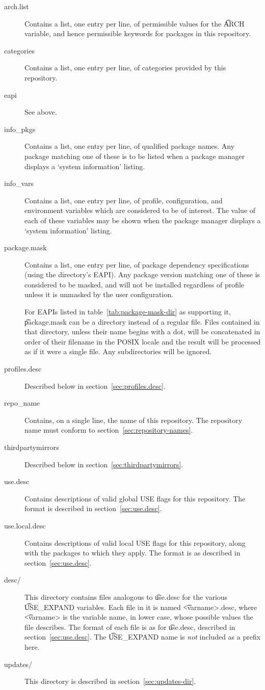 \begin{description}
\item[arch.list] Contains a list, one entry per line, of permissible values for the \t{ARCH}
    variable, and hence permissible keywords for packages in this repository.
\item[categories] Contains a list, one entry per line, of categories provided by this repository.
\item[eapi] See above.
\item[info_pkgs] Contains a list, one entry per line, of qualified package names. Any package
    matching one of these is to be listed when a package manager displays a `system information'
    listing.
\item[info_vars] Contains a list, one entry per line, of profile, configuration, and environment
    variables which are considered to be of interest. The value of each of these variables may be
    shown when the package manager displays a `system information' listing.
\item[package.mask]
    Contains a list, one entry per line, of package dependency specifications (using the directory's
    EAPI). Any package version matching one of these is considered to be masked, and will not be
    installed regardless of profile unless it is unmasked by the user configuration.

     For EAPIs listed in table~\ref{tab:package-mask-dir} as
    supporting it, \t{package.mask} can be a directory instead of a regular file. Files contained
    in that directory, unless their name begins with a dot, will be concatenated in order of their
    filename in the POSIX locale and the result will be processed as if it were a single file.
    Any subdirectories will be ignored.
\item[profiles.desc] Described below in section~\ref{sec:profiles.desc}.
\item[repo_name] Contains, on a single line, the name of this repository. The repository name must
    conform to section~\ref{sec:repository-names}.
\item[thirdpartymirrors] Described below in section~\ref{sec:thirdpartymirrors}.
\item[use.desc] Contains descriptions of valid global USE flags for this repository. The format is
    described in section~\ref{sec:use.desc}.
\item[use.local.desc] Contains descriptions of valid local USE flags for this repository, along with
    the packages to which they apply. The format is as described in section~\ref{sec:use.desc}.
\item[desc/] This directory contains files analogous to \t{use.desc} for the various \t{USE_EXPAND}
    variables. Each file in it is named \t{<varname>.desc}, where \t{<varname>} is the variable
    name, in lower case, whose possible values the file describes. The format of each file is as for
    \t{use.desc}, described in section~\ref{sec:use.desc}. The \t{USE_EXPAND} name is \emph{not}
    included as a prefix here.
\item[updates/] This directory is described in section~\ref{sec:updates-dir}.
\end{description}


